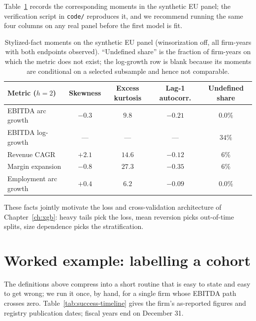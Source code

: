 Table~\ref{tab:success-stylized} records the corresponding moments in the synthetic EU
panel; the verification script in \texttt{code/} reproduces it, and we recommend running
the same four columns on any real panel before the first model is fit.

\begin{table}[htbp]
\centering
\small
\begin{tabular}{lcccc}
\toprule
Metric ($h=2$) & Skewness & Excess kurtosis & Lag-1 autocorr. & Undefined share \\
\midrule
EBITDA arc growth      & $-0.3$ & $9.8$  & $-0.21$ & $0.0\%$ \\
EBITDA log-growth      & ---    & ---    & ---     & $34\%$ \\
Revenue CAGR           & $+2.1$ & $14.6$ & $-0.12$ & $6\%$ \\
Margin expansion       & $-0.8$ & $27.3$ & $-0.35$ & $6\%$ \\
Employment arc growth  & $+0.4$ & $6.2$  & $-0.09$ & $0.0\%$ \\
\bottomrule
\end{tabular}
\caption{Stylized-fact moments on the synthetic EU panel (winsorization off, all
firm-years with both endpoints observed). ``Undefined share'' is the fraction of
firm-years on which the metric does not exist; the log-growth row is blank because its
moments are conditional on a selected subsample and hence not comparable.}
\label{tab:success-stylized}
\end{table}

These facts jointly motivate the loss and cross-validation architecture of
Chapter~\ref{ch:xgb}: heavy tails pick the loss, mean reversion picks out-of-time
splits, size dependence picks the stratification.

\section{Worked example: labelling a cohort}
\label{sec:success-worked}

The definitions above compress into a short routine that is easy to state and easy to
get wrong; we run it once, by hand, for a single firm whose EBITDA path crosses zero.
Table~\ref{tab:success-timeline} gives the firm's as-reported figures and registry
publication dates; fiscal years end on December 31.

